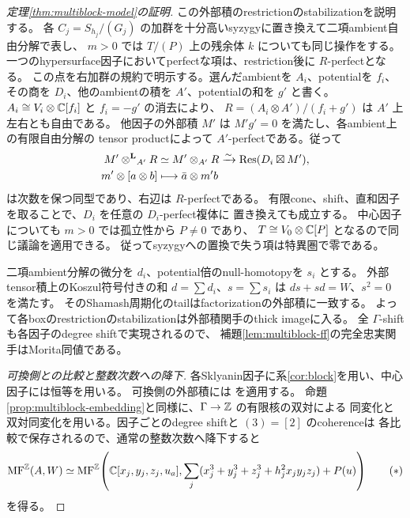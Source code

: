 \begin{proof}[定理\ref{thm:multiblock-model}の証明]
 この外部積のrestrictionのstabilizationを説明する。
 各 \(C_j=S_{h_j}/(G_j)\) の加群を十分高いsyzygyに置き換えて二項ambient自由分解で表し、
 \(m>0\) では \(T/(P)\) 上の残余体 \(k\) についても同じ操作をする。
 一つのhypersurface因子においてperfectな項は、restriction後に \(R\)-perfectとなる。
 この点を右加群の規約で明示する。選んだambientを \(A_i\)、potentialを \(f_i\)、
 その商を \(D_i\)、他のambientの積を \(A'\)、potentialの和を \(g'\) と書く。
 \(A_i\cong V_i\otimes\mathbb C[f_i]\) と \(f_i=-g'\) の消去により、
 \(R=(A_i\otimes A')/(f_i+g')\) は \(A'\) 上左右とも自由である。
 他因子の外部積 \(M'\) は \(M'g'=0\) を満たし、各ambient上の有限自由分解の
 tensor productによって \(A'\)-perfectである。従って
 \[
 \begin{aligned}
 M'\mathbin{\otimes^{\mathbf L}}_{A'}R&\simeq M'\otimes_{A'}R
       \xrightarrow{\sim}\operatorname{Res}(D_i\boxtimes M'),\\
 m'\otimes[a\otimes b]&\longmapsto\bar a\otimes m'b
 \end{aligned}
 \]
 は次数を保つ同型であり、右辺は \(R\)-perfectである。
 有限cone、shift、直和因子を取ることで、\(D_i\) を任意の \(D_i\)-perfect複体に
 置き換えても成立する。
 中心因子についても \(m>0\) では孤立性から \(P\ne0\) であり、
 \(T\cong V_0\otimes\mathbb C[P]\) となるので同じ議論を適用できる。
 従ってsyzygyへの置換で失う項は特異圏で零である。

 二項ambient分解の微分を \(d_i\)、potential倍のnull-homotopyを \(s_i\) とする。
 外部tensor積上のKoszul符号付きの和 \(d=\sum d_i\)、\(s=\sum s_i\) は
 \(ds+sd=W\)、\(s^2=0\) を満たす。
 そのShamash周期化のtailはfactorizationの外部積に一致する。
 よって各boxのrestrictionのstabilizationは外部積関手のthick imageに入る。
 全 \(\Gamma\)-shiftも各因子のdegree shiftで実現されるので、
 補題\ref{lem:multiblock-ff}の完全忠実関手はMorita同値である。

 \emph{可換側との比較と整数次数への降下.}
 各Sklyanin因子に系\ref{cor:block}を用い、中心因子には恒等を用いる。
 可換側の外部積には \cite[Theorem 5.15, Corollary 5.18]{BFK} を適用する。
 命題\ref{prop:multiblock-embedding}と同様に、\(\Gamma\to\mathbb Z\) の有限核の双対による
 同変化と双対同変化を用いる。因子ごとのdegree shiftと \((3)=[2]\) のcoherenceは
 各比較で保存されるので、通常の整数次数へ降下すると
 \[
 \operatorname{MF}^{\mathbb Z}(A,W)\simeq
 \operatorname{MF}^{\mathbb Z}\!\left(\mathbb C[x_j,y_j,z_j,u_a],
 \sum_j(x_j^3+y_j^3+z_j^3+h_j^2x_jy_jz_j)+P(u)\right)
 \tag{\(*\)}\label{eq:PI-model}
 \]
 を得る。


\end{proof}
